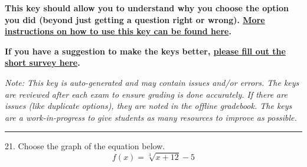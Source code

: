 \documentclass{article}[14pt]
\begin{document}
\textbf{This key should allow you to understand why you choose the option you did (beyond just getting a question right or wrong). \href{https://xronos.clas.ufl.edu/mac1105spring2020/courseDescriptionAndMisc/Exams/LearningFromResults}{More instructions on how to use this key can be found here}.}

\textbf{If you have a suggestion to make the keys better, \href{https://forms.gle/CZkbZmPbC9XALEE88}{please fill out the short survey here}.}

\textit{Note: This key is auto-generated and may contain issues and/or errors. The keys are reviewed after each exam to ensure grading is done accurately. If there are issues (like duplicate options), they are noted in the offline gradebook. The keys are a work-in-progress to give students as many resources to improve as possible.}

\rule{\textwidth}{0.4pt}

21. Choose the graph of the equation below.
$$ f(x) = \sqrt[3]{x + 12} - 5 $$ 
\end{document}
